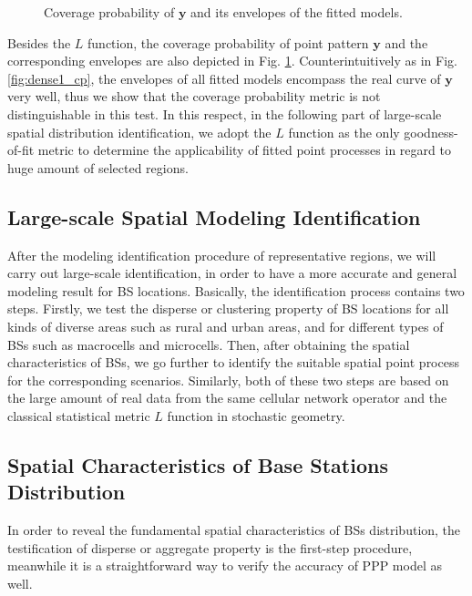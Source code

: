 \begin{figure} [!htb]
\centering
 \hspace{1in}
\caption{Coverage probability of $\mathbf{y}$ and its envelopes of the fitted models. }
\label{fig:rural1_cp}
\end{figure}

Besides the $L$ function, the coverage probability of point pattern $\mathbf{y}$ and the corresponding envelopes are also depicted in Fig. \ref{fig:rural1_cp}. Counterintuitively as in Fig. \ref{fig:dense1_cp}, the envelopes of all fitted models encompass the real curve of $\mathbf{y}$ very well, thus we show that the coverage probability metric is not distinguishable in this test. In this respect, in the following part of large-scale spatial distribution identification, we adopt the $L$ function as the only goodness-of-fit metric to determine the applicability of fitted point processes in regard to huge amount of selected regions.
\subsection{Large-scale Spatial Modeling Identification}
After the modeling identification procedure of representative regions, we will carry out large-scale identification, in order to have a more accurate and general modeling result for BS locations. Basically, the identification process contains two steps. Firstly, we test the disperse or clustering property of BS locations for all kinds of diverse areas such as rural and urban areas, and for different types of BSs such as macrocells and microcells. Then, after obtaining the spatial characteristics of BSs, we go further to identify the suitable spatial point process for the corresponding scenarios. Similarly, both of these two steps are based on the large amount of real data from the same cellular network operator and the classical statistical metric $L$ function in stochastic geometry.
\subsection*{Spatial Characteristics of Base Stations Distribution}
In order to reveal the fundamental spatial characteristics of BSs distribution, the testification of disperse or aggregate property is the first-step procedure, meanwhile it is a straightforward way to verify the accuracy of PPP model as well.


